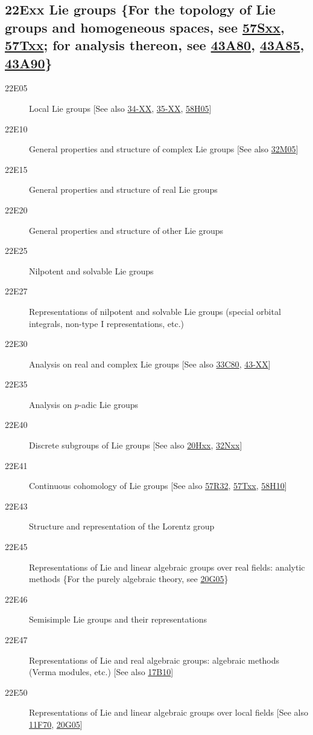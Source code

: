 \documentclass[letterpaper]{article}
\begin{document}
\subsection*{22Exx  Lie groups \{For the topology of Lie groups and homogeneous spaces, see \hyperref[57Sxx]{57Sxx}, \hyperref[57Txx]{57Txx}; for analysis thereon, see \hyperref[43A80]{43A80}, \hyperref[43A85]{43A85}, \hyperref[43A90]{43A90}\} }\label{22Exx}
\begin{description}  
\item [22E05]\label{22E05} Local Lie groups [See also \hyperref[34-XX]{34-XX}, \hyperref[35-XX]{35-XX}, \hyperref[58H05]{58H05}]
\item [22E10]\label{22E10} General properties and structure of complex Lie groups [See also \hyperref[32M05]{32M05}]
\item [22E15]\label{22E15} General properties and structure of real Lie groups
\item [22E20]\label{22E20} General properties and structure of other Lie groups
\item [22E25]\label{22E25} Nilpotent and solvable Lie groups
\item [22E27]\label{22E27} Representations of nilpotent and solvable Lie groups (special orbital integrals, non-type I representations, etc.)
\item [22E30]\label{22E30} Analysis on real and complex Lie groups [See also \hyperref[33C80]{33C80}, \hyperref[43-XX]{43-XX}]
\item [22E35]\label{22E35} Analysis on $p$-adic Lie groups
\item [22E40]\label{22E40} Discrete subgroups of Lie groups [See also \hyperref[20Hxx]{20Hxx}, \hyperref[32Nxx]{32Nxx}]
\item [22E41]\label{22E41} Continuous cohomology of Lie groups [See also \hyperref[57R32]{57R32}, \hyperref[57Txx]{57Txx}, \hyperref[58H10]{58H10}]
\item [22E43]\label{22E43} Structure and representation of the Lorentz group
\item [22E45]\label{22E45} Representations of Lie and linear algebraic groups over real fields: analytic methods \{For the purely algebraic theory, see \hyperref[20G05]{20G05}\}
\item [22E46]\label{22E46} Semisimple Lie groups and their representations
\item [22E47]\label{22E47} Representations of Lie and real algebraic groups: algebraic methods (Verma modules, etc.) [See also \hyperref[17B10]{17B10}]
\item [22E50]\label{22E50} Representations of Lie and linear algebraic groups over local fields [See also \hyperref[11F70]{11F70}, \hyperref[20G05]{20G05}]

\end{description}
\end{document}

